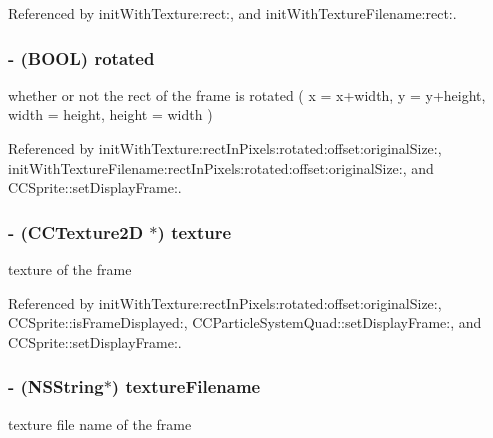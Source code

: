 Referenced by init\-With\-Texture\-:rect\-:, and init\-With\-Texture\-Filename\-:rect\-:.

\hypertarget{interface_c_c_sprite_frame_a53892235ea1f843c39d9be3eaea3a05c}{
\subsubsection[{rotated}]{\setlength{\rightskip}{0pt plus 5cm}-\/ (B\-O\-O\-L) {\bf rotated}}}\label{interface_c_c_sprite_frame_a53892235ea1f843c39d9be3eaea3a05c}
whether or not the rect of the frame is rotated ( x = x+width, y = y+height, width = height, height = width ) 

Referenced by init\-With\-Texture\-:rect\-In\-Pixels\-:rotated\-:offset\-:original\-Size\-:, init\-With\-Texture\-Filename\-:rect\-In\-Pixels\-:rotated\-:offset\-:original\-Size\-:, and C\-C\-Sprite\-::set\-Display\-Frame\-:.

\hypertarget{interface_c_c_sprite_frame_a0241dc02a4432faa4652116169a80510}{
\subsubsection[{texture}]{\setlength{\rightskip}{0pt plus 5cm}-\/ ({\bf C\-C\-Texture2\-D} $\ast$) {\bf texture}}}\label{interface_c_c_sprite_frame_a0241dc02a4432faa4652116169a80510}
texture of the frame 

Referenced by init\-With\-Texture\-:rect\-In\-Pixels\-:rotated\-:offset\-:original\-Size\-:, C\-C\-Sprite\-::is\-Frame\-Displayed\-:, C\-C\-Particle\-System\-Quad\-::set\-Display\-Frame\-:, and C\-C\-Sprite\-::set\-Display\-Frame\-:.

\hypertarget{interface_c_c_sprite_frame_a39ae0d4d63eac89d6d5b9d9d433046f2}{
\subsubsection[{texture\-Filename}]{\setlength{\rightskip}{0pt plus 5cm}-\/ (N\-S\-String$\ast$) {\bf texture\-Filename}}}\label{interface_c_c_sprite_frame_a39ae0d4d63eac89d6d5b9d9d433046f2}
texture file name of the frame 

